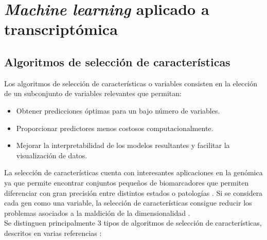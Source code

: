 \chapter{\textit{Machine learning} aplicado a transcriptómica}

\section{Algoritmos de selección de características}

Los algoritmos de selección de características o variables consisten en la elección de un subconjunto de variables relevantes que permitan:

\begin{itemize}
	\item Obtener predicciones óptimas para un bajo número de variables.
	\item Proporcionar predictores menos costosos computacionalmente.
	\item Mejorar la interpretabilidad de los modelos resultantes y facilitar la visualización de datos.
\end{itemize} 

La selección de características cuenta con interesantes aplicaciones en la genómica ya que permite encontrar conjuntos pequeños de biomarcadores que permiten diferenciar con gran precisión entre distintos estados o patologías \cite{Xing, Tadist2019}. Si se considera cada gen como una variable, la selección de características consigue reducir los problemas asociados a la maldición de la dimensionalidad \cite{Bellman1957, Bellman1961}. \\

Se distinguen principalmente 3 tipos de algoritmos de selección de características, descritos en varias referencias \cite{HerreraMaldonado2020, Tadist2019}:

